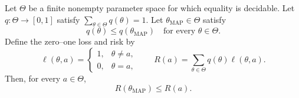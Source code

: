 \begin{theorem}
Let $\Theta$ be a finite nonempty parameter space for which equality is
decidable. Let $q:\Theta\to[0,1]$ satisfy
$\sum_{\theta\in\Theta}q(\theta)=1$. Let $\theta_{\mathrm{MAP}}\in\Theta$
satisfy
\[
 q(\theta)\leq q(\theta_{\mathrm{MAP}})
 \quad\text{for every }\theta\in\Theta.
\]
Define the zero--one loss and risk by
\[
 \ell(\theta,a)=
 \begin{cases}
 1,&\theta\ne a,\\
 0,&\theta=a,
 \end{cases}
 \qquad
 R(a)=\sum_{\theta\in\Theta}q(\theta)\ell(\theta,a).
\]
Then, for every $a\in\Theta$,
\[
 R(\theta_{\mathrm{MAP}})\leq R(a).
\]
\end{theorem}
